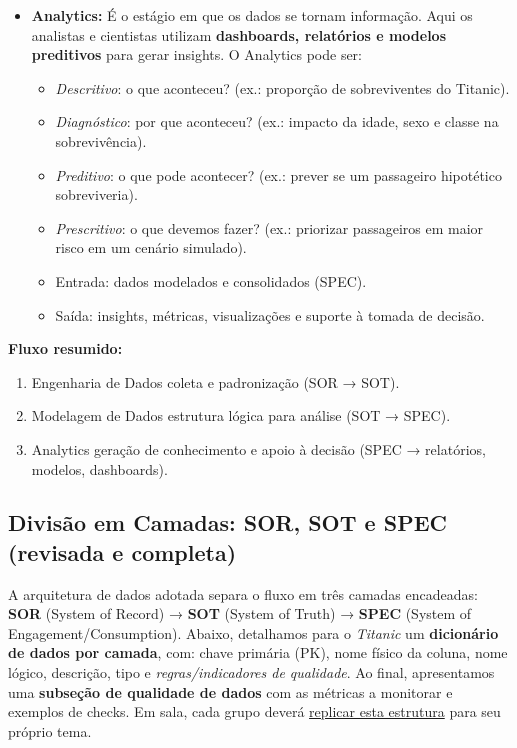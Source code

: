 \documentclass[12pt,a4paper]{article}
\begin{document}
\begin{itemize}
    \item \textbf{Analytics:} 
    É o estágio em que os dados se tornam informação. Aqui os analistas e cientistas utilizam \textbf{dashboards, relatórios e modelos preditivos} para gerar insights. 
    O Analytics pode ser:
    \begin{itemize}
        \item \textit{Descritivo}: o que aconteceu? (ex.: proporção de sobreviventes do Titanic).
        \item \textit{Diagnóstico}: por que aconteceu? (ex.: impacto da idade, sexo e classe na sobrevivência).
        \item \textit{Preditivo}: o que pode acontecer? (ex.: prever se um passageiro hipotético sobreviveria).
        \item \textit{Prescritivo}: o que devemos fazer? (ex.: priorizar passageiros em maior risco em um cenário simulado).
    \end{itemize}
    
    \begin{itemize}
        \item Entrada: dados modelados e consolidados (SPEC).
        \item Saída: insights, métricas, visualizações e suporte à tomada de decisão.
    \end{itemize}
\end{itemize}

\noindent
\textbf{Fluxo resumido:} 
\begin{enumerate}
    \item Engenharia de Dados \textrightarrow coleta e padronização (SOR → SOT).
    \item Modelagem de Dados \textrightarrow estrutura lógica para análise (SOT → SPEC).
    \item Analytics \textrightarrow geração de conhecimento e apoio à decisão (SPEC → relatórios, modelos, dashboards).
\end{enumerate}


\subsection{Divisão em Camadas: SOR, SOT e SPEC (revisada e completa)}

A arquitetura de dados adotada separa o fluxo em três camadas encadeadas: \textbf{SOR} (System of Record) → \textbf{SOT} (System of Truth) → \textbf{SPEC} (System of Engagement/Consumption). Abaixo, detalhamos para o \textit{Titanic} um \textbf{dicionário de dados por camada}, com: chave primária (PK), nome físico da coluna, nome lógico, descrição, tipo e \textit{regras/indicadores de qualidade}. Ao final, apresentamos uma \textbf{subseção de qualidade de dados} com as métricas a monitorar e exemplos de checks. Em sala, cada grupo deverá \underline{replicar esta estrutura} para seu próprio tema.
\end{document}
